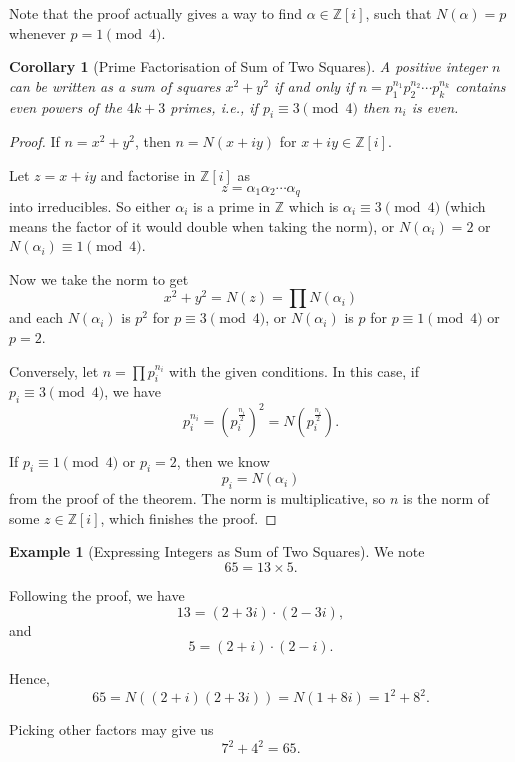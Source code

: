\documentclass{article}
\newtheorem{corollary}[theorem]{Corollary}
\theoremstyle{definition}
\newtheorem{example}[theorem]{Example}
\theoremstyle{remark}
\newcommand{\pqty}[1]{\left(#1\right)}
\newcommand{\bqty}[1]{\left[#1\right]}
\newcommand{\flatfrac}[2]{\frac{#1}{#2}}
\newcommand{\ZZ}{\mathbb{Z}}
\begin{document}
Note that the proof actually gives a way to find \(\alpha \in \ZZ\bqty{i}\), such that \(N\pqty{\alpha} = p\) whenever \(p = 1 \pmod{4}\).

\begin{corollary}[Prime Factorisation of Sum of Two Squares]
    \label{cor:int-sum-of-two-qaures}%
    A positive integer \(n\) can be written as a sum of squares \(x^2 + y^2\) if and only if \(n = p_1 ^{n_1} p_2^{n_2} \cdots p_k^{n_k}\) contains even powers of the \(4k + 3\) primes, i.e., if \(p_i \equiv 3 \pmod{4}\) then \(n_i\) is even.
\end{corollary}

\begin{proof}
    If \(n = x^2 + y^2\), then \(n = N\pqty{x + iy}\) for \(x + iy \in \ZZ\bqty{i}\).

    Let \(z = x + iy\) and factorise in \(\ZZ\bqty{i}\) as
    \[
        z = \alpha_1 \alpha_2 \cdots \alpha_q
    \]
    into irreducibles. So either \(\alpha_i\) is a prime in \(\ZZ\) which is \(\alpha_i \equiv 3 \pmod{4}\) (which means the factor of it would double when taking the norm), or \(N\pqty{\alpha_i} = 2\) or \(N\pqty{\alpha_i} \equiv 1 \pmod{4}\).

    Now we take the norm to get
    \[
        x^2 + y^2 = N\pqty{z} = \prod N\pqty{\alpha_i}
    \]
    and each \(N\pqty{\alpha_i}\) is \(p^2\) for \(p \equiv 3 \pmod{4}\), or \(N\pqty{\alpha_i}\) is \(p\) for \(p \equiv 1 \pmod{4}\) or \(p = 2\).

    Conversely, let \(n = \prod p_i^{n_i}\) with the given conditions. In this case, if \(p_i \equiv 3 \pmod{4}\), we have
    \[
        p_i^{n_i} = \pqty{p_i^{\flatfrac{n_i}{2}}}^2 = N\pqty{p_i^{\flatfrac{n_i}{2}}}.
    \]

    If \(p_i \equiv 1 \pmod{4}\) or \(p_i = 2\), then we know
    \[
        p_i = N \pqty{\alpha_i}
    \]
    from the proof of the theorem. The norm is multiplicative, so \(n\) is the norm of some \(z \in \ZZ\bqty{i}\), which finishes the proof.
\end{proof}

\begin{example}[Expressing Integers as Sum of Two Squares]
    \label{ex:integers-sum-of-squares}%
    We note
    \[
        65 = 13 \times 5.
    \]

    Following the proof, we have
    \[
        13 = \pqty{2 + 3i} \cdot \pqty{2 - 3i},
    \]
    and
    \[
        5 = \pqty{2 + i} \cdot \pqty{2 - i}.
    \]

    Hence,
    \[
        65 = N\pqty{\pqty{2 + i} \pqty{2 + 3i}} = N\pqty{1 + 8i} = 1^2 + 8^2.
    \]

    Picking other factors may give us
    \[
        7^2 + 4^2 = 65.
    \]
\end{example}
\end{document}
